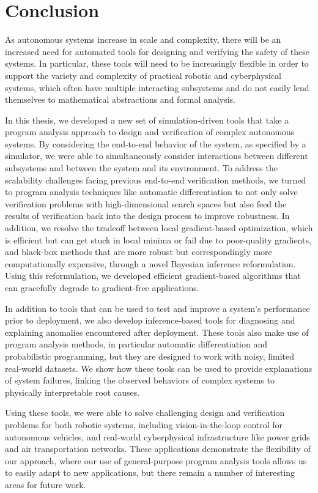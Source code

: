 \chapter{Conclusion}\label{section:conclusion}

As autonomous systems increase in scale and complexity, there will be an increased need for automated tools for designing and verifying the safety of these systems. In particular, these tools will need to be increasingly flexible in order to support the variety and complexity of practical robotic and cyberphysical systems, which often have multiple interacting subsystems and do not easily lend themselves to mathematical abstractions and formal analysis.

In this thesis, we developed a new set of simulation-driven tools that take a program analysis approach to design and verification of complex autonomous systems. By considering the end-to-end behavior of the system, as specified by a simulator, we were able to simultaneously consider interactions between different subsystems and between the system and its environment. To address the scalability challenges facing previous end-to-end verification methods, we turned to program analysis techniques like automatic differentiation to not only solve verification problems with high-dimensional search spaces but also feed the results of verification back into the design process to improve robustness. In addition, we resolve the tradeoff between local gradient-based optimization, which is efficient but can get stuck in local minima or fail due to poor-quality gradients, and black-box methods that are more robust but correspondingly more computationally expensive, through a novel Bayesian inference reformulation. Using this reformulation, we developed efficient gradient-based algorithms that can gracefully degrade to gradient-free applications.

In addition to tools that can be used to test and improve a system's performance prior to deployment, we also develop inference-based tools for diagnosing and explaining anomalies encountered after deployment. These tools also make use of program analysis methods, in particular automatic differentiation and probabilistic programming, but they are designed to work with noisy, limited real-world datasets. We show how these tools can be used to provide explanations of system failures, linking the observed behaviors of complex systems to physically interpretable root causes.

Using these tools, we were able to solve challenging design and verification problems for both robotic systems, including vision-in-the-loop control for autonomous vehicles, and real-world cyberphysical infrastructure like power grids and air transportation networks. These applications demonstrate the flexibility of our approach, where our use of general-purpose program analysis tools allows us to easily adapt to new applications, but there remain a number of interesting areas for future work.

